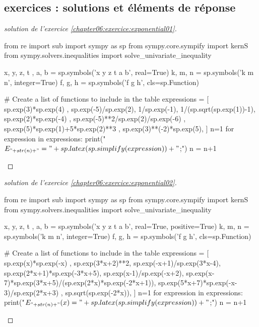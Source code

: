 \documentclass[main.tex]{subfiles}
\begin{document}
\subsection{exercices : solutions et éléments de réponse}
\begin{proof}[solution de l'exercice \ref{chapter06:exercice:exponential01}]  \scriptsize
	\noindent
\begin{pycode}
from re import sub
import sympy as sp
from sympy.core.sympify import kernS
from sympy.solvers.inequalities import solve_univariate_inequality

x, y, z, t , a, b = sp.symbols('x y z t a b', real=True)
k, m, n = sp.symbols('k m n', integer=True)
f, g, h = sp.symbols('f g h', cls=sp.Function)

# Create a list of functions to include in the table
expressions = [
sp.exp(3)*sp.exp(4) ,
sp.exp(-5)/sp.exp(2),
1/sp.exp(-1),
1/(sp.sqrt(sp.exp(1))-1),
sp.exp(2)*sp.exp(-4) ,
sp.exp(-5)**2/sp.exp(2)/sp.exp(-6) ,
sp.exp(5)*sp.exp(1)+5*sp.exp(2)**3 ,
sp.exp(3)**(-2)*sp.exp(5),
]
n=1
for expression in expressions:
	print("$E_{"+str(n)+ "}="+ sp.latex(sp.simplify(expression))+"$;\;")
	n = n+1
\end{pycode}
\end{proof}
\begin{proof}[solution de l'exercice \ref{chapter06:exercice:exponential02}]  \scriptsize
\noindent
\begin{pycode}
from re import sub
import sympy as sp
from sympy.core.sympify import kernS
from sympy.solvers.inequalities import solve_univariate_inequality

x, y, z, t , a, b = sp.symbols('x y z t a b', real=True, positive=True)
k, m, n = sp.symbols('k m n', integer=True)
f, g, h = sp.symbols('f g h', cls=sp.Function) 


# Create a list of functions to include in the table
expressions = [ 
sp.exp(x)*sp.exp(-x) ,
sp.exp(3*x+2)**2,
sp.exp(-x+1)/sp.exp(3*x-4),
sp.exp(2*x+1)*sp.exp(-3*x+5),
sp.exp(x-1)/sp.exp(-x+2),
sp.exp(x-7)*sp.exp(3*x+5)/(sp.exp(2*x)*sp.exp(-2*x+1)),
sp.exp(5*x+7)*sp.exp(-x-3)/sp.exp(2*x+3) ,
sp.sqrt(sp.exp(-2*x)),
]
n=1
for expression in expressions:
	print("$E_{"+str(n)+ "}(x)="+ sp.latex(sp.simplify(expression))+"$;\;")
	n = n+1
\end{pycode}
\end{proof}
\end{document}
